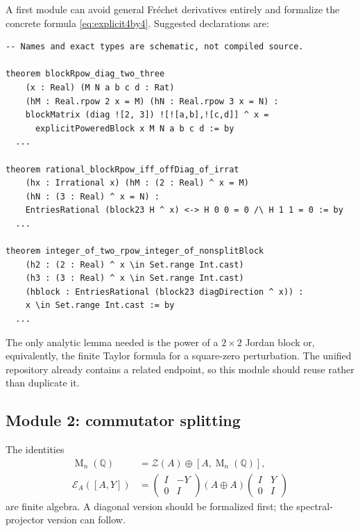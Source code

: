 \documentclass[11pt,oneside]{article}
\theoremstyle{definition}
\theoremstyle{remark}
\newcommand{\Q}{\mathbb Q}
\newcommand{\Mat}{\operatorname{M}}
\newcommand{\cE}{\mathcal E}
\newcommand{\cZ}{\mathcal Z}
\newcommand{\lean}[1]{\texttt{\detokenize{#1}}}
\begin{document}
A first module can avoid general Fr\'echet derivatives entirely and formalize the concrete
formula \eqref{eq:explicit4by4}.  Suggested declarations are:

\begin{lstlisting}[style=leanstyle,caption={Schematic Lean targets for the explicit block model.}]
-- Names and exact types are schematic, not compiled source.

theorem blockRpow_diag_two_three
    (x : Real) (M N a b c d : Rat)
    (hM : Real.rpow 2 x = M) (hN : Real.rpow 3 x = N) :
    blockMatrix (diag ![2, 3]) ![![a,b],![c,d]] ^ x =
      explicitPoweredBlock x M N a b c d := by
  ...

theorem rational_blockRpow_iff_offDiag_of_irrat
    (hx : Irrational x) (hM : (2 : Real) ^ x = M)
    (hN : (3 : Real) ^ x = N) :
    EntriesRational (block23 H ^ x) <-> H 0 0 = 0 /\ H 1 1 = 0 := by
  ...

theorem integer_of_two_rpow_integer_of_nonsplitBlock
    (h2 : (2 : Real) ^ x \in Set.range Int.cast)
    (h3 : (3 : Real) ^ x \in Set.range Int.cast)
    (hblock : EntriesRational (block23 diagDirection ^ x)) :
    x \in Set.range Int.cast := by
  ...
\end{lstlisting}

The only analytic lemma needed is the power of a $2\times2$ Jordan block or, equivalently, the
finite Taylor formula for a square-zero perturbation.  The unified repository already contains
a related 
\lean{JordanFirstJet} endpoint, so this module should reuse rather than duplicate it.

\subsection{Module 2: commutator splitting}

The identities
\begin{align*}
 \Mat_n(\Q)&=\cZ(A)\oplus[A,\Mat_n(\Q)],\\
 \cE_A([A,Y])&=
 \begin{pmatrix}I&-Y\\0&I\end{pmatrix}
 (A\oplus A)
 \begin{pmatrix}I&Y\\0&I\end{pmatrix}
\end{align*}
are finite algebra.  A diagonal version should be formalized first; the spectral-projector
version can follow.
\end{document}
